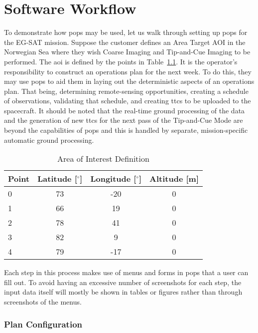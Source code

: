 \glsresetall{} 


\chapter{Software Workflow}\label{chap:workflow}

To demonstrate how \gls{pops} may be used, let us walk through setting up
\gls{pops} for the EG-SAT mission. Suppose the customer defines an Area Target
AOI in the Norwegian Sea where they wish Coarse Imaging and Tip-and-Cue Imaging
to be performed. The \gls{aoi} is defined by the points  in
Table~\ref{tab:norway-aoi}. It is the operator’s responsibility to construct an
operations plan for the next week. To do this, they may use \gls{pops} to aid
them in laying out the deterministic aspects of an operations plan.  That
being, determining remote-sensing opportunities, creating a schedule of
observations, validating that schedule, and creating \glspl{ttc} to be uploaded
to the spacecraft. It should be noted that the real-time ground processing of
the data and the generation of new \glspl{ttc} for the next pass of the
Tip-and-Cue Mode are beyond the capabilities of \gls{pops} and this is handled
by separate, mission-specific automatic ground processing.

\begin{table}[h] 
    \centering
    \caption{Area of Interest Definition}
    \begin{tabular}{cccc}
	Point                  & Latitude [$^\circ$] & Longitude [$^\circ$] & Altitude [m] \\ \hline
	\multicolumn{1}{l|}{0} & 73       & -20      & 0        \\
	\multicolumn{1}{l|}{1} & 66       & 19       & 0        \\
	\multicolumn{1}{l|}{2} & 78       & 41       & 0        \\
	\multicolumn{1}{l|}{3} & 82       & 9        & 0        \\
	\multicolumn{1}{l|}{4} & 79       & -17      & 0       
    \end{tabular}
    \label{tab:norway-aoi}
\end{table}

Each step in this process makes use of menus and forms in \gls{pops} that a
user can fill out. To avoid having an excessive number of screenshots for each
step, the input data itself will mostly be shown in tables or figures rather than
through screenshots of the menus.

\subsection{Plan Configuration}

